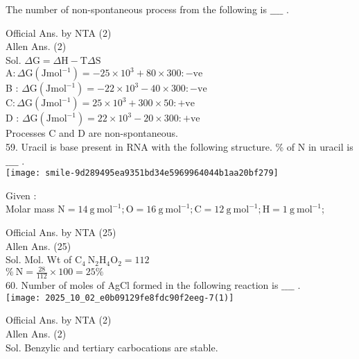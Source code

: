 \documentclass[10pt]{article}
\begin{document}
The number of non-spontaneous process from the following is \(\_\_\_\_\) .

Official Ans. by NTA (2)\\
Allen Ans. (2)\\
Sol. \(\Delta \mathrm{G}=\Delta \mathrm{H}-\mathrm{T} \Delta \mathrm{S}\)\\
\(\mathrm{A}: \Delta \mathrm{G}\left(\mathrm{J} \mathrm{mol}^{-1}\right)=-25 \times 10^{3}+80 \times 300:-\mathrm{ve}\)\\
B : \(\Delta \mathrm{G}\left(\mathrm{J} \mathrm{mol}^{-1}\right)=-22 \times 10^{3}-40 \times 300:-\mathrm{ve}\)\\
\(\mathrm{C}: \Delta \mathrm{G}\left(\mathrm{J} \mathrm{mol}^{-1}\right)=25 \times 10^{3}+300 \times 50:+\mathrm{ve}\)\\
D : \(\Delta \mathrm{G}\left(\mathrm{J} \mathrm{mol}^{-1}\right)=22 \times 10^{3}-20 \times 300:+\mathrm{ve}\)\\
Processes C and D are non-spontaneous.\\
59. Uracil is base present in RNA with the following structure. \% of N in uracil is \(\_\_\_\_\) .\\
\texttt{[image: smile-9d289495ea9351bd34e5969964044b1aa20bf279]}

Given :\\
Molar mass \(\mathrm{N}=14 \mathrm{~g} \mathrm{~mol}^{-1} ; \mathrm{O}=16 \mathrm{~g} \mathrm{~mol}^{-1} ; \mathrm{C}= 12 \mathrm{~g} \mathrm{~mol}^{-1} ; \mathrm{H}=1 \mathrm{~g} \mathrm{~mol}^{-1}\);

Official Ans. by NTA (25)\\
Allen Ans. (25)\\
Sol. Mol. Wt of \(\mathrm{C}_{4} \mathrm{~N}_{2} \mathrm{H}_{4} \mathrm{O}_{2}=112\)\\
\(\% \mathrm{~N}=\frac{28}{112} \times 100=25 \%\)\\
60. Number of moles of AgCl formed in the following reaction is \(\_\_\_\_\) .\\
\texttt{[image: 2025\_10\_02\_e0b09129fe8fdc90f2eeg-7(1)]}

Official Ans. by NTA (2)\\
Allen Ans. (2)\\
Sol. Benzylic and tertiary carbocations are stable.
\end{document}

